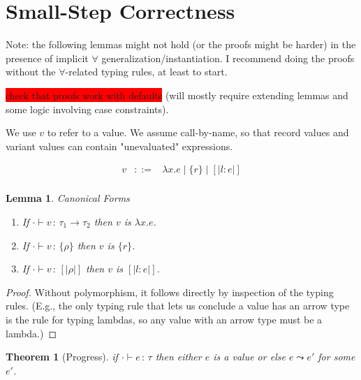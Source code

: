 \documentclass{article}
\newcommand{\todo}[1]{\colorbox{red}{#1}}
\newtheorem{theorem}{Theorem}
\newtheorem{lemma}{Lemma}
\newcommand{\define}{::=}
\newcommand{\variant}[1]{[\!|#1|\!]}
\newcommand{\lam}[2]{\lambda #1 . #2}
\newcommand{\hastp}[3]{#1 \vdash #2 \,:\, #3}
\newcommand{\step}[2]{#1 \leadsto #2}
\begin{document}
\section{Small-Step Correctness}

Note: the following lemmas might not hold (or the proofs might be harder) in the presence of
implicit $\forall$ generalization/instantiation. I recommend doing the proofs without
the $\forall$-related typing rules, at least to start.

\todo {check that proofs work with defaults} (will mostly require extending
lemmas and some logic involving case constraints).

\bigskip


We use $v$ to refer to a value. We assume call-by-name, so that record values and
variant values can contain "unevaluated" expressions.

\[\begin{array}{rcl}
v & \define & \lam{x}{e} \mid \{r\} \mid \variant{l:e}\\
\end{array}
\]


\begin{lemma}{Canonical Forms} \label{lem:canonical-forms}
\mbox{}
\begin{enumerate}
\item If $\hastp{\cdot}{v}{\tau_1\to\tau_2}$ then $v$ is $\lam{x}{e}$.
\item If $\hastp{\cdot}{v}{\{\rho\}}$ then $v$ is $\{r\}$.
\item If $\hastp{\cdot}{v}{\variant{\rho}}$ then $v$ is $\variant{l:e}$.
\end{enumerate}
\end{lemma}

\begin{proof}
Without polymorphism, it follows directly by inspection of the typing rules. (E.g.,
the only typing rule that lets us conclude a value has an arrow type is the rule for
typing lambdas, so any value with an arrow type must be a lambda.)
\end{proof}

\begin{theorem}[Progress]
if $\hastp{\cdot}{e}{\tau}$ then either $e$ is a value or else $\step{e}{e'}$ for some $e'$.
\end{theorem}
\end{document}
